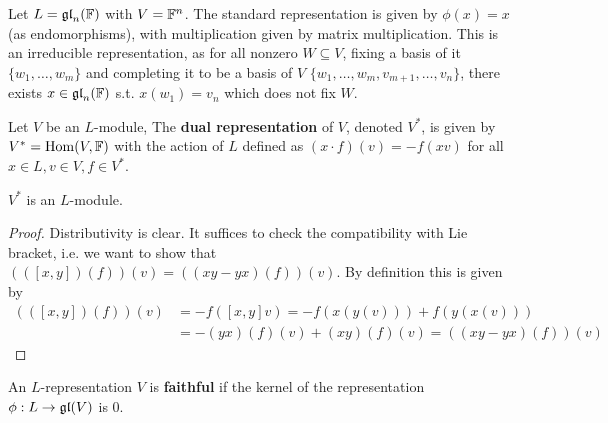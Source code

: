\documentclass{article}
\begin{document}
\begin{example}
    Let $L = \mathfrak{gl}_n(\mathbb{F})$ with $V = \mathbb{F}^n$. The standard representation is given by $\phi(x) = x$ (as endomorphisms), with multiplication given by matrix multiplication. This is an irreducible representation, as for all nonzero $W \subseteq V$, fixing a basis of it $\{w_1, \dots, w_m\}$ and completing it to be a basis of $V$ $\{ w_1, \dots, w_m, v_{m+1}, \dots, v_n \}$, there exists $x \in \mathfrak{gl}_n(\mathbb{F})$ s.t. $x(w_1) = v_n$ which does not fix $W$.
\end{example}

\begin{definition}
    Let $V$ be an $L$-module, The \textbf{dual representation} of $V$, denoted $V^*$, is given by $V^* = \mathrm{Hom}(V, \mathbb{F})$ with the action of $L$ defined as $(x \cdot f)(v) = -f(xv)$ for all $x \in L, v \in V, f \in V^*$.
\end{definition}

\begin{lemma}
    $V^*$ is an $L$-module.
\end{lemma}

\begin{proof}
    Distributivity is clear. It suffices to check the compatibility with Lie bracket, i.e. we want to show that $(([x, y])(f))(v) = ((xy - yx)(f))(v)$. By definition this is given by
    \begin{align*}
        (([x, y])(f))(v) &= -f([x, y]v) = -f(x(y(v))) + f(y(x(v))) \\
        & = -(yx)(f)(v) + (xy)(f)(v) = ((xy - yx)(f))(v)
    \end{align*}
\end{proof}

\begin{definition}
    An $L$-representation $V$ is \textbf{faithful} if the kernel of the representation $\phi: L \to \mathfrak{gl}(V)$ is 0.
\end{definition}
\end{document}
